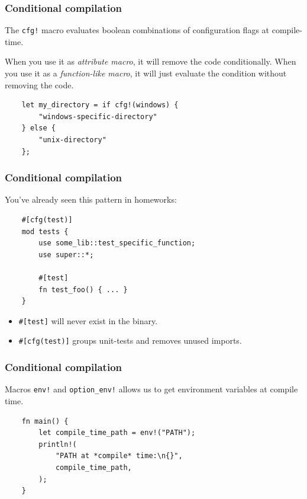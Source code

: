\documentclass[aspectratio=1610,t]{beamer}
\begin{document}

\begin{frame}[fragile]
\frametitle{Conditional compilation}
The \texttt{cfg!} macro evaluates boolean combinations of configuration flags at compile-time.

When you use it as \textit{attribute macro}, it will remove the code conditionally. When you use it as a \textit{function-like macro}, it will just evaluate the condition without removing the code.

\begin{verbatim}
    let my_directory = if cfg!(windows) {
        "windows-specific-directory"
    } else {
        "unix-directory"
    };
\end{verbatim}
\end{frame}


\begin{frame}[fragile]
\frametitle{Conditional compilation}
You've already seen this pattern in homeworks:

\begin{verbatim}
    #[cfg(test)]
    mod tests {
        use some_lib::test_specific_function;
        use super::*;

        #[test]
        fn test_foo() { ... }
    }
\end{verbatim}

\begin{itemize}
    \item \texttt{\#[test]} will never exist in the binary.
    \item \texttt{\#[cfg(test)]} groups unit-tests and removes unused imports.
\end{itemize}
\end{frame}


\begin{frame}[fragile]
\frametitle{Conditional compilation}
Macros \texttt{env!} and \texttt{option\_env!} allows us to get environment variables at compile time.

\begin{verbatim}
    fn main() {
        let compile_time_path = env!("PATH");
        println!(
            "PATH at *compile* time:\n{}",
            compile_time_path,
        );
    }
\end{verbatim}
\end{frame}
\end{document}
